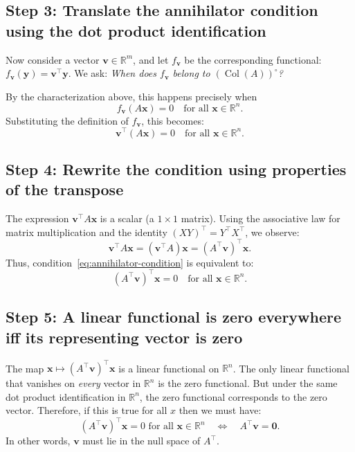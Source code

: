 \documentclass[11pt]{article}
\newcommand{\col}{\operatorname{Col}}
\newcommand{\R}{\mathbb{R}}
\begin{document}
\subsection*{Step 3: Translate the annihilator condition using the dot product identification}

Now consider a vector $\mathbf{v} \in \R^m$, and let $f_{\mathbf{v}}$ be the corresponding functional: $f_{\mathbf{v}}(\mathbf{y}) = \mathbf{v}^\top \mathbf{y}$.  
We ask: \textit{When does $f_{\mathbf{v}}$ belong to $(\col(A))^\circ$?}

By the characterization above, this happens precisely when
\[
f_{\mathbf{v}}(A\mathbf{x}) = 0 \quad \text{for all } \mathbf{x} \in \R^n.
\]
Substituting the definition of $f_{\mathbf{v}}$, this becomes:
\begin{equation}
\label{eq:annihilator-condition}
\mathbf{v}^\top (A\mathbf{x}) = 0 \quad \text{for all } \mathbf{x} \in \R^n.
\end{equation}

\subsection*{Step 4: Rewrite the condition using properties of the transpose}

The expression $\mathbf{v}^\top A \mathbf{x}$ is a scalar (a $1 \times 1$ matrix). Using the associative law for matrix multiplication and the identity $(XY)^\top = Y^\top X^\top$, we observe:
\[
\mathbf{v}^\top A \mathbf{x} = (\mathbf{v}^\top A) \mathbf{x} = (A^\top \mathbf{v})^\top \mathbf{x}.
\]
Thus, condition~\eqref{eq:annihilator-condition} is equivalent to:
\[
(A^\top \mathbf{v})^\top \mathbf{x} = 0 \quad \text{for all } \mathbf{x} \in \R^n.
\]

\subsection*{Step 5: A linear functional is zero everywhere iff its representing vector is zero}

The map $\mathbf{x} \mapsto (A^\top \mathbf{v})^\top \mathbf{x}$ is a linear functional on $\R^n$. The only linear functional that vanishes on \textit{every} vector in $\R^n$ is the zero functional. But under the same dot product identification in $\R^n$, the zero functional corresponds to the zero vector. Therefore, if this is true for all $x$ then we must have:
\[
(A^\top \mathbf{v})^\top \mathbf{x} = 0 \text{ for all } \mathbf{x} \in \R^n \quad \Longleftrightarrow \quad A^\top \mathbf{v} = \mathbf{0}.
\]
In other words, $\mathbf{v}$ must lie in the null space of $A^\top$.
\end{document}
